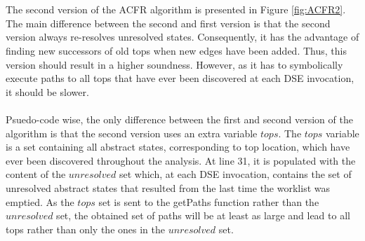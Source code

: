 \documentclass{kththesis}
\begin{document}
\\ \\
The second version of the ACFR algorithm is presented in Figure \ref{fig:ACFR2}. The main difference between the second and first version is that the second version always re-resolves unresolved states. Consequently, it has the advantage of finding new successors of old tops when new edges have been added. Thus, this version should result in a higher soundness. However, as it has to symbolically execute paths to all tops that have ever been discovered at each DSE invocation, it should be slower.
\\ \\
Psuedo-code wise, the only difference between the first and second version of the algorithm is that the second version uses an extra variable $tops$. The $tops$ variable is a set containing all abstract states, corresponding to top location, which have ever been discovered throughout the analysis. At line 31, it is populated with the content of the $unresolved$ set which, at each DSE invocation, contains the set of unresolved abstract states that resulted from the last time the worklist was emptied. As the $tops$ set is sent to the getPaths function rather than the $unresolved$ set, the obtained set of paths will be at least as large and lead to all tops rather than only the ones in the $unresolved$ set.






\end{document}
